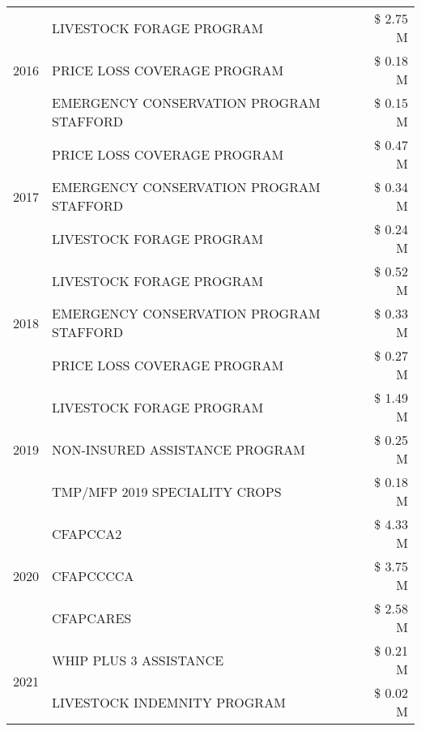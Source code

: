 \begin{tabular}{llr}
\cline{1-3}
\multirow[t]{3}{*}{2016} & LIVESTOCK FORAGE PROGRAM & \$ 2.75 M \\
 & PRICE LOSS COVERAGE PROGRAM & \$ 0.18 M \\
 & EMERGENCY CONSERVATION PROGRAM STAFFORD & \$ 0.15 M \\
\cline{1-3}
\multirow[t]{3}{*}{2017} & PRICE LOSS COVERAGE PROGRAM & \$ 0.47 M \\
 & EMERGENCY CONSERVATION PROGRAM STAFFORD & \$ 0.34 M \\
 & LIVESTOCK FORAGE PROGRAM & \$ 0.24 M \\
\cline{1-3}
\multirow[t]{3}{*}{2018} & LIVESTOCK FORAGE PROGRAM & \$ 0.52 M \\
 & EMERGENCY CONSERVATION PROGRAM STAFFORD & \$ 0.33 M \\
 & PRICE LOSS COVERAGE PROGRAM & \$ 0.27 M \\
\cline{1-3}
\multirow[t]{3}{*}{2019} & LIVESTOCK FORAGE PROGRAM & \$ 1.49 M \\
 & NON-INSURED ASSISTANCE PROGRAM & \$ 0.25 M \\
 & TMP/MFP 2019 SPECIALITY CROPS & \$ 0.18 M \\
\cline{1-3}
\multirow[t]{3}{*}{2020} & CFAPCCA2 & \$ 4.33 M \\
 & CFAPCCCCA & \$ 3.75 M \\
 & CFAPCARES & \$ 2.58 M \\
\cline{1-3}
\multirow[t]{2}{*}{2021} & WHIP PLUS 3 ASSISTANCE & \$ 0.21 M \\
 & LIVESTOCK INDEMNITY PROGRAM & \$ 0.02 M \\
\cline{1-3}
\bottomrule
\end{tabular}
